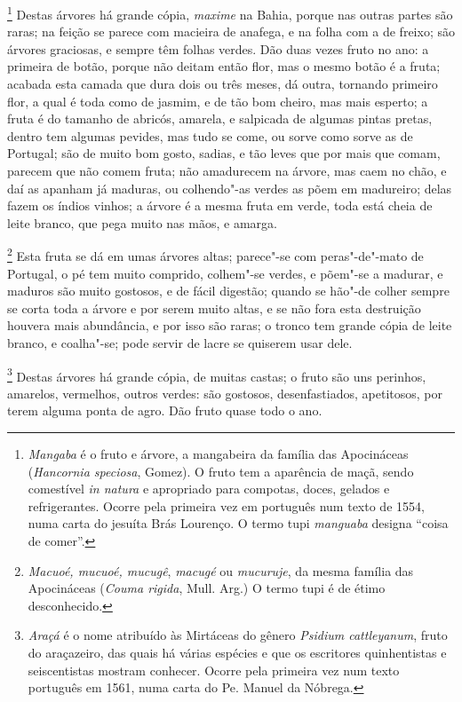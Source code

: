 \footnote{ \textit{Mangaba} é o fruto e árvore, a
mangabeira da família das Apocináceas (\textit{Hancornia speciosa}, 
Gomez). O fruto tem a aparência de maçã, sendo comestível \textit{in
natura} e apropriado para compotas, doces, gelados e refrigerantes.
Ocorre pela primeira vez em português num texto de 1554, numa
carta do jesuíta Brás Lourenço. O termo tupi \textit{manguaba}
designa ``coisa de comer''.} Destas árvores há grande cópia, 
\textit{maxime} na Bahia, porque nas outras partes são raras; na feição se
parece com macieira de anafega, e na folha com a de freixo; são árvores
graciosas, e sempre têm folhas verdes. Dão duas vezes fruto no ano: a
primeira de botão, porque não deitam então flor, mas o mesmo botão é a
fruta; acabada esta camada que dura dois ou três meses, dá outra,
tornando primeiro flor, a qual é toda como de jasmim, e de tão bom
cheiro, mas mais esperto; a fruta é do tamanho de abricós, amarela, e
salpicada de algumas pintas pretas, dentro tem algumas pevides, mas
tudo se come, ou sorve como sorve as de Portugal; são de muito bom
gosto, sadias, e tão leves que por mais que comam, parecem que não
comem fruta; não amadurecem na árvore, mas caem no chão, e daí as
apanham já maduras, ou colhendo"-as verdes as põem em madureiro; delas
fazem os índios vinhos; a árvore é a mesma fruta em verde, toda está
cheia de leite branco, que pega muito nas mãos, e amarga.

\footnote{ \textit{Macuoé, mucuoé, mucugê}, 
\textit{macugé} ou \textit{mucuruje}, da mesma família das Apocináceas
(\textit{Couma rigida}, Mull. Arg.) O termo tupi é de étimo
desconhecido.} Esta fruta se dá em umas árvores
altas; parece"-se com peras"-de"-mato de Portugal, o pé tem muito
comprido, colhem"-se verdes, e põem"-se a madurar, e maduros são muito
gostosos, e de fácil digestão; quando se hão"-de colher sempre se corta
toda a árvore e por serem muito altas, e se não fora esta destruição
houvera mais abundância, e por isso são raras; o tronco tem grande
cópia de leite branco, e coalha"-se; pode servir de lacre se quiserem
usar dele.

\footnote{ \textit{Araçá} é o nome atribuído às
Mirtáceas do gênero \textit{Psidium cattleyanum}, fruto do
araçazeiro, das quais há várias espécies e que os escritores
quinhentistas e seiscentistas mostram conhecer. Ocorre pela primeira
vez num texto português em 1561, numa carta do Pe. Manuel da
Nóbrega.} Destas árvores há grande cópia, de muitas
castas; o fruto são uns perinhos, amarelos, vermelhos, outros verdes:
são gostosos, desenfastiados, apetitosos, por terem alguma ponta de
agro. Dão fruto quase todo o ano.

